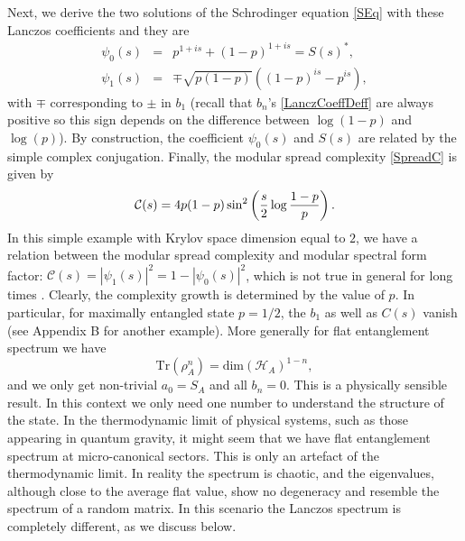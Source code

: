 \documentclass[aps,prl,twocolumn,showpacs,preprintnumbers,amsmath,amssymb]{revtex4-1}
\def\frac#1#2{{#1\over #2}}
\newcommand{\Tr}{\text{Tr}}
\def\be{\begin{equation}}
\def\ee{\end{equation}}
\newcommand{\bea}{\begin{eqnarray}}
\newcommand{\eea}{\end{eqnarray}}
\begin{document}
Next, we derive the two solutions of the Schrodinger equation \eqref{SEq} with these Lanczos coefficients and they are 
\bea
\psi_0(s)&=&p^{1+is}+(1-p)^{1+is}=S(s)^*,\nonumber\\
\psi_1(s)&=&\mp\sqrt{p(1-p)}((1-p)^{is}-p^{is}),
\eea
with $\mp$ corresponding to $\pm$ in $b_1$ (recall that $b_n$'s \eqref{LanczCoeffDeff} are always positive so this sign depends on the difference between $\log(1-p)$ and $\log(p)$). By construction, the coefficient $\psi_0(s)$ and $S(s)$ are related by the simple complex conjugation.  Finally, the modular spread complexity \eqref{SpreadC} is given by
\be
\mathcal{C}(s)=4p(1-p)\sin^2\left(\frac{s}{2}\log\frac{1-p}{p}\right).
\ee
In this simple example with Krylov space dimension equal to $2$, we have a relation between the modular spread complexity and modular spectral form factor: $\mathcal{C}(s)=|\psi_1(s)|^2=1-|\psi_0(s)|^2$, which is not true in general for long times \cite{Erdmenger:2023shk}. Clearly, the complexity growth is determined by the value of $p$. In particular, for maximally entangled state $p=1/2$, the $b_1$ as well as $C(s)$ vanish (see Appendix B for another example). More generally for flat entanglement spectrum we have
\be
\Tr(\rho^n_A)=\text{dim}(\mathcal{H}_A)^{1-n},
\ee
and we only get non-trivial $a_0=S_A$ and all $b_n=0$. This is a physically sensible result. In this context we only need one number to understand the structure of the state. In the thermodynamic limit of physical systems, such as those appearing in quantum gravity, it might seem  that we have flat entanglement spectrum at micro-canonical sectors. This is only an artefact of the thermodynamic limit. In reality the spectrum is chaotic, and the eigenvalues, although close to the average flat value, show no degeneracy and resemble the spectrum of a random matrix. In this scenario the Lanczos spectrum is completely different, as we discuss below.
\end{document}
